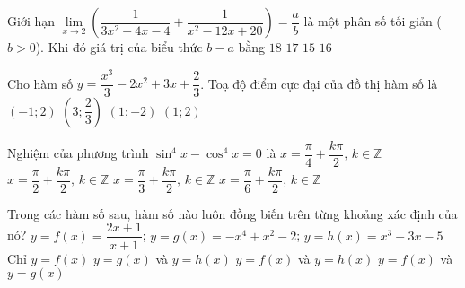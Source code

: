 \begin{ex}%
Giới hạn $\lim\limits_{x\to 2}\left(\dfrac{1}{3x^2-4x-4}+\dfrac{1}{x^2-12x+20}\right)=\dfrac{a}{b}$ là một phân số tối giản ($b>0$). Khi đó giá trị của biểu thức $b-a$ bằng
\choice
{$18$}
{\True $17$}
{$15$}
{$16$}	
\end{ex}

\begin{ex}%
	Cho hàm số $ y = \dfrac{x^3}{3}- 2x^2+ 3x + \dfrac{2}{3}$. Toạ độ điểm cực đại của đồ thị hàm số là
	\choice
	{$(-1;2)$}
	{$\left(3;\dfrac{2}{3}\right)$}
	{$(1;-2)$}
	{\True $(1;2)$}
\end{ex}
\begin{ex}%
	Nghiệm của phương trình $\sin^4x -\cos^4x = 0 $ là
	\choice
{\True $x=\dfrac{\pi}{4}+\dfrac{k\pi}{2},\, k\in\mathbb{Z}$}
{$x=\dfrac{\pi}{2}+\dfrac{k\pi}{2},\, k\in\mathbb{Z}$}
{$x=\dfrac{\pi}{3}+\dfrac{k\pi}{2},\, k\in\mathbb{Z}$}
{$x=\dfrac{\pi}{6}+\dfrac{k\pi}{2},\, k\in\mathbb{Z}$}
\end{ex}
\begin{ex}%
	Trong các hàm số sau, hàm số nào luôn đồng biến trên từng khoảng xác định của nó?
	$y=f(x)=\dfrac{2x+1}{x+1}$; $y=g(x)=-x^4+x^2-2$; $y=h(x)=x^3-3x-5$
	\choice
	{\True Chỉ $y=f(x)$}
	{$y=g(x)$ và $y=h(x)$}
	{$y=f(x)$ và $y=h(x)$}
	{$y=f(x)$ và $y=g(x)$}
\end{ex}
		

